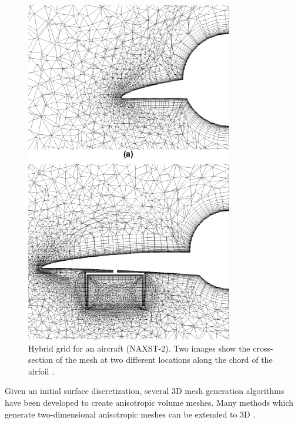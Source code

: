 \begin{figure}
\begin{minipage}{0.45\linewidth}
	\includegraphics[width=\linewidth]{img/intro/lit/ito.png}
	\caption[Hybrid grid for aircraft NAXST-2]{Hybrid grid for an aircraft (NAXST-2). Two images show the cross-section of the mesh at two different locations along the chord of the airfoil \cite{ito2002unstructured}.}
	\label{fig-ito}
\end{minipage}
\end{figure}

Given an initial surface discretization, several 3D mesh generation algorithms have been developed to create anisotropic volume meshes. Many methods which generate two-dimensional anisotropic  meshes can be extended to 3D \cite{lohner1993matching, nakahashi1987fdm,castro1997anisotropic}.

